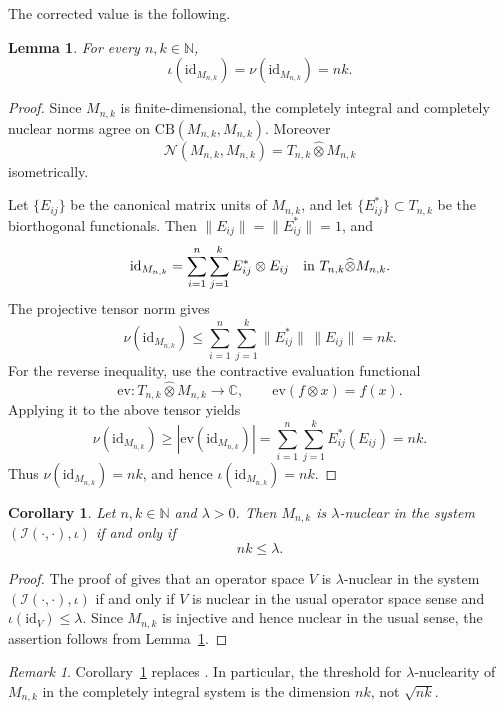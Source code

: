 \documentclass[11pt]{article}
\newtheorem{lemma}[theorem]{Lemma}
\newtheorem{corollary}[theorem]{Corollary}
\theoremstyle{remark}
\newtheorem{remark}[theorem]{Remark}
\newcommand{\id}{\mathrm{id}}
\newcommand{\CB}{\mathrm{CB}}
\newcommand{\CN}{\mathcal N}
\newcommand{\CI}{\mathcal I}
\newcommand{\ohat}{\widehat{\otimes}}
\begin{document}
The corrected value is the following.

\begin{lemma}\label{lem:id-rectangular}
For every \(n,k\in \mathbb N\),
\[
        \iota(\id_{M_{n,k}})=\nu(\id_{M_{n,k}})=nk.
\]
\end{lemma}

\begin{proof}
Since \(M_{n,k}\) is finite-dimensional, the completely integral and
completely nuclear norms agree on \(\CB(M_{n,k},M_{n,k})\).  Moreover
\[
        \CN(M_{n,k},M_{n,k}) = T_{n,k}\ohat M_{n,k}
\]
isometrically.

Let \(\{E_{ij}\}\) be the canonical matrix units of \(M_{n,k}\), and let
\(\{E_{ij}^{*}\}\subset T_{n,k}\) be the biorthogonal functionals.  Then
\(\|E_{ij}\|=\|E_{ij}^{*}\|=1\), and
\[
        \id_{M_{n,k}}
        =
        \sum_{i=1}^{n}\sum_{j=1}^{k} E_{ij}^{*}\otimes E_{ij}
        \quad\hbox{in }T_{n,k}\ohat M_{n,k}.
\]
The projective tensor norm gives
\[
        \nu(\id_{M_{n,k}})
        \leq
        \sum_{i=1}^{n}\sum_{j=1}^{k}
        \|E_{ij}^{*}\|\,\|E_{ij}\|
        = nk.
\]
For the reverse inequality, use the contractive evaluation functional
\[
        \mathrm{ev}:T_{n,k}\ohat M_{n,k}\longrightarrow \mathbb C,
        \qquad
        \mathrm{ev}(f\otimes x)=f(x).
\]
Applying it to the above tensor yields
\[
        \nu(\id_{M_{n,k}})
        \geq
        |\mathrm{ev}(\id_{M_{n,k}})|
        =
        \sum_{i=1}^{n}\sum_{j=1}^{k} E_{ij}^{*}(E_{ij})
        = nk.
\]
Thus \(\nu(\id_{M_{n,k}})=nk\), and hence
\(\iota(\id_{M_{n,k}})=nk\).
\end{proof}

\begin{corollary}\label{cor:corrected-rectangular}
Let \(n,k\in\mathbb N\) and \(\lambda>0\).  Then \(M_{n,k}\) is
\(\lambda\)-nuclear in the system \((\CI(\cdot,\cdot),\iota)\) if and
only if
\[
        nk\leq \lambda.
\]
\end{corollary}

\begin{proof}
The proof of \cite[Lemma 3.12]{DTZ} gives that an operator space \(V\) is
\(\lambda\)-nuclear in the system \((\CI(\cdot,\cdot),\iota)\) if and
only if \(V\) is nuclear in the usual operator space sense and
\(\iota(\id_V)\leq \lambda\).  Since \(M_{n,k}\) is injective and hence
nuclear in the usual sense, the assertion follows from
Lemma~\ref{lem:id-rectangular}.
\end{proof}

\begin{remark}
Corollary~\ref{cor:corrected-rectangular} replaces
\cite[Theorem 3.14]{DTZ}.  In particular, the threshold for
\(\lambda\)-nuclearity of \(M_{n,k}\) in the completely integral system is
the dimension \(nk\), not \(\sqrt{nk}\).
\end{remark}
\end{document}
